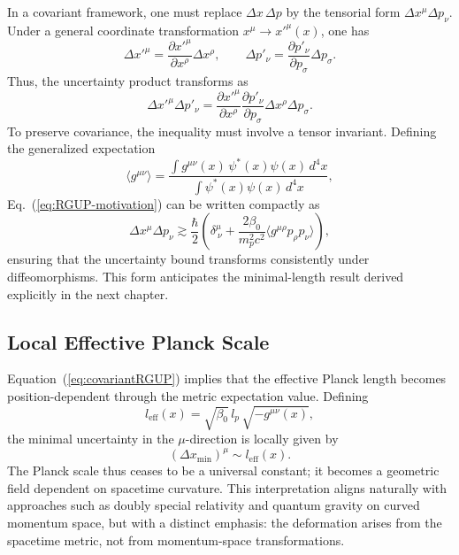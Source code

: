 \documentclass[11pt,oneside]{book}
\numberwithin{equation}{chapter}
\begin{document}
In a covariant framework, one must replace $\Delta x\,\Delta p$ by the tensorial form $\Delta x^\mu\Delta p_\nu$.  
Under a general coordinate transformation $x^\mu\rightarrow x'^{\mu}(x)$, one has
\begin{equation}
\Delta x'^{\mu}=\frac{\partial x'^{\mu}}{\partial x^{\rho}}\Delta x^{\rho},
\qquad
\Delta p'_{\nu}=\frac{\partial p'_{\nu}}{\partial p_{\sigma}}\Delta p_{\sigma}.
\end{equation}
Thus, the uncertainty product transforms as
\begin{equation}
\Delta x'^{\mu}\Delta p'_{\nu}=
\frac{\partial x'^{\mu}}{\partial x^{\rho}}
\frac{\partial p'_{\nu}}{\partial p_{\sigma}}
\Delta x^{\rho}\Delta p_{\sigma}.
\label{eq:covtrans}
\end{equation}
To preserve covariance, the inequality must involve a tensor invariant.  
Defining the generalized expectation
\begin{equation}
\langle g^{\mu\nu}\rangle
=\frac{\int g^{\mu\nu}(x)\,\psi^*(x)\psi(x)\,d^4x}
{\int \psi^*(x)\psi(x)\,d^4x},
\end{equation}
Eq.~(\ref{eq:RGUP-motivation}) can be written compactly as
\begin{equation}
\Delta x^{\mu}\Delta p_{\nu}\gtrsim
\frac{\hbar}{2}
\left(
\delta^{\mu}_{\ \nu}
+\frac{2\beta_0}{m_p^2c^2}
\langle g^{\mu\rho}p_{\rho}p_{\nu}\rangle
\right),
\label{eq:covariantRGUP}
\end{equation}
ensuring that the uncertainty bound transforms consistently under diffeomorphisms.  
This form anticipates the minimal-length result derived explicitly in the next chapter.

\subsection*{Local Effective Planck Scale}

Equation~(\ref{eq:covariantRGUP}) implies that the effective Planck length becomes position-dependent through the metric expectation value.  
Defining
\begin{equation}
l_{\text{eff}}(x)=\sqrt{\beta_0}\,l_p\,\sqrt{-g^{\mu\nu}(x)},
\label{eq:leff}
\end{equation}
the minimal uncertainty in the $\mu$-direction is locally given by
\begin{equation}
(\Delta x_{\min})^{\mu}\sim l_{\text{eff}}(x).
\label{eq:localmin}
\end{equation}
The Planck scale thus ceases to be a universal constant; it becomes a geometric field dependent on spacetime curvature.  
This interpretation aligns naturally with approaches such as doubly special relativity and quantum gravity on curved momentum space, but with a distinct emphasis: the deformation arises from the spacetime metric, not from momentum-space transformations.
\end{document}
